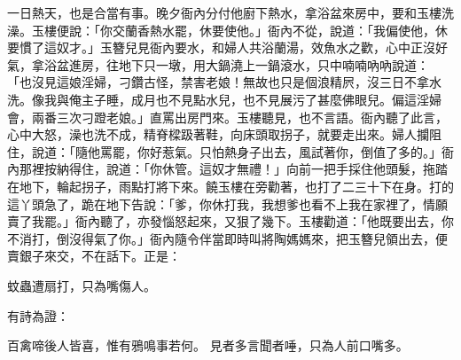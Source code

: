 \begin{showcontents}{}
一日熱天，也是合當有事。晚夕衙內分付他廚下熱水，拿浴盆來房中，要和玉樓洗澡。玉樓便說：「你交蘭香熱水罷，休要使他。」衙內不從，說道：「我偏使他，休要慣了這奴才。」玉簪兒見衙內要水，和婦人共浴蘭湯，效魚水之歡，心中正沒好氣，拿浴盆進房，往地下只一墩，用大鍋澆上一鍋滾水，只中喃喃吶吶說道： 「也沒見這娘淫婦，刁鑽古怪，禁害老娘！無故也只是個浪精屄，沒三日不拿水洗。像我與俺主子睡，成月也不見點水兒，也不見展污了甚麼佛眼兒。偏這淫婦會，兩番三次刁蹬老娘。」直罵出房門來。玉樓聽見，也不言語。衙內聽了此言，心中大怒，澡也洗不成，精脊樑趿著鞋，向床頭取拐子，就要走出來。婦人攔阻住，說道：「隨他罵罷，你好惹氣。只怕熱身子出去，風試著你，倒值了多的。」衙內那裡按納得住，說道：「你休管。這奴才無禮！」向前一把手採住他頭髮，拖踏在地下，輪起拐子，雨點打將下來。饒玉樓在旁勸著，也打了二三十下在身。打的這丫頭急了，跪在地下告說：「爹，你休打我，我想爹也看不上我在家裡了，情願賣了我罷。」衙內聽了，亦發惱怒起來，又狠了幾下。玉樓勸道：「他既要出去，你不消打，倒沒得氣了你。」衙內隨令伴當即時叫將陶媽媽來，把玉簪兒領出去，便賣銀子來交，不在話下。正是：

蚊蟲遭扇打，只為嘴傷人。

有詩為證：

百禽啼後人皆喜，惟有鴉鳴事若何。
見者多言聞者唾，只為人前口嘴多。



\end{showcontents}

